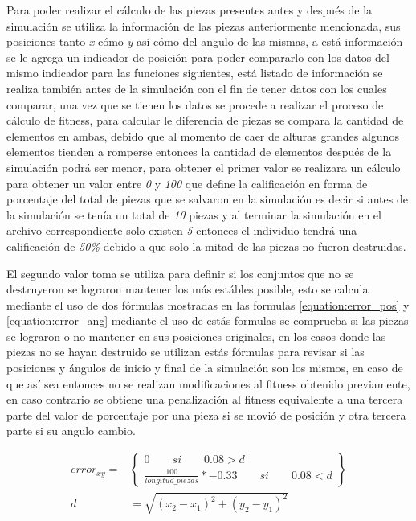 Para poder realizar el cálculo de las piezas presentes antes y después de la
simulación se utiliza la información de las piezas anteriormente mencionada, sus
posiciones tanto \textit{x} cómo \textit{y} así cómo del angulo de las mismas, a
está información se le agrega un indicador de posición para poder compararlo con
los datos del mismo indicador para las funciones siguientes, está listado de
información se realiza también antes de la simulación con el fin de tener datos
con los cuales comparar, una vez que se tienen los datos se procede a realizar
el proceso de cálculo de fitness, para calcular le diferencia de piezas se
compara la cantidad de elementos en ambas, debido que al momento de caer de
alturas grandes algunos elementos tienden a romperse entonces la cantidad de
elementos después de la simulación podrá ser menor, para obtener el primer valor
se realizara un cálculo para obtener un valor entre \textit{0} y \textit{100}
que define la calificación en forma de porcentaje del total de piezas que se
salvaron en la simulación es decir si antes de la simulación se tenía un total
de \textit{10} piezas y al terminar la simulación en el archivo correspondiente
solo existen \textit{5} entonces el individuo tendrá una calificación de
\textit{50\%} debido a que solo la mitad de las piezas no fueron destruidas.

El segundo valor toma se utiliza para definir si los conjuntos que no se
destruyeron se lograron mantener los más estábles posible, esto se calcula
mediante el uso de dos fórmulas mostradas en las formulas
\ref{equation:error_pos} y \ref{equation:error_ang} mediante el uso de estás
formulas se comprueba si las piezas se lograron o no mantener en sus posiciones
originales, en los casos donde las piezas no se hayan destruido se utilizan
estás fórmulas para revisar si las posiciones y ángulos de inicio y final de la
simulación son los mismos, en caso de que así sea entonces no se realizan
modificaciones al fitness obtenido previamente, en caso contrario se obtiene una
penalización al fitness equivalente a una tercera parte del valor de porcentaje
por una pieza si se movió de posición y otra tercera parte si su angulo cambio.

\begin{equation}
    \begin{split}
      error_{xy} = & 
      \begin{Bmatrix}
        0 \qquad si \qquad 0.08 > d \\ 
        \frac{100}{longitud\_piezas} * -0.33 \qquad si \qquad 0.08 < d
      \end{Bmatrix} \\
       d & = \sqrt{(x_2 - x_1)^2 + (y_2 - y_1)^2}
    \end{split}
    \label{equation:error_pos}
\end{equation}

